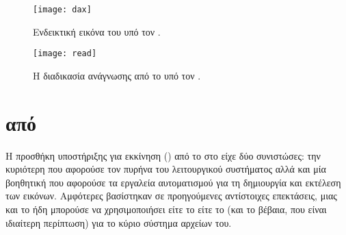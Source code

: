 \begin{figure}
    \centering
    \texttt{[image: dax]}
    \caption{Ενδεικτική εικόνα του  υπό τον .}
    \label{fig:dax-overview}
\end{figure}

\begin{figure}
    \begin{minipage}[c][\textheight]{\textwidth}
        \centering
        \texttt{[image: read]}
        \caption{Η διαδικασία ανάγνωσης από το \viofs{} υπό τον .}
        \label{fig:dax-flowchart}
    \end{minipage}
\end{figure}

\section{ από \viofs{}}

Η προσθήκη υποστήριξης για εκκίνηση () από το \viofs{} στο \osv{}
είχε δύο συνιστώσες: την κυριότερη που αφορούσε τον πυρήνα του λειτουργικού
συστήματος αλλά και μία βοηθητική που αφορούσε τα εργαλεία αυτοματισμού για τη
δημιουργία και εκτέλεση των εικόνων. Αμφότερες βασίστηκαν σε προηγούμενες
αντίστοιχες επεκτάσεις, μιας και το \osv{} ήδη μπορούσε να χρησιμοποιήσει
είτε το  είτε το  (και το  βέβαια, που είναι
ιδιαίτερη περίπτωση) για το κύριο  σύστημα αρχείων του.

